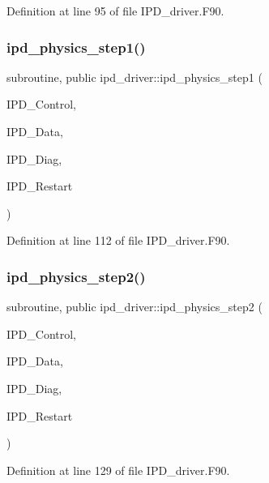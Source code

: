 Definition at line 95 of file I\+P\+D\+\_\+driver.\+F90.

\mbox{\label{namespaceipd__driver_abafd0a9f2cf822a3be45b837afe561fb}} 
\subsubsection{ipd\+\_\+physics\+\_\+step1()}
{\footnotesize\ttfamily subroutine, public ipd\+\_\+driver\+::ipd\+\_\+physics\+\_\+step1 (\begin{DoxyParamCaption}\item[{type(ipd\+\_\+control\+\_\+type), intent(inout)}]{I\+P\+D\+\_\+\+Control,  }\item[{type(ipd\+\_\+data\+\_\+type), intent(inout)}]{I\+P\+D\+\_\+\+Data,  }\item[{type(ipd\+\_\+diag\+\_\+type), dimension(\+:), intent(inout)}]{I\+P\+D\+\_\+\+Diag,  }\item[{type(ipd\+\_\+restart\+\_\+type), intent(inout)}]{I\+P\+D\+\_\+\+Restart }\end{DoxyParamCaption})}



Definition at line 112 of file I\+P\+D\+\_\+driver.\+F90.

\mbox{\label{namespaceipd__driver_a613c24c131f22ad6cc51bd3a33f9baee}} 
\subsubsection{ipd\+\_\+physics\+\_\+step2()}
{\footnotesize\ttfamily subroutine, public ipd\+\_\+driver\+::ipd\+\_\+physics\+\_\+step2 (\begin{DoxyParamCaption}\item[{type(ipd\+\_\+control\+\_\+type), intent(inout)}]{I\+P\+D\+\_\+\+Control,  }\item[{type(ipd\+\_\+data\+\_\+type), intent(inout)}]{I\+P\+D\+\_\+\+Data,  }\item[{type(ipd\+\_\+diag\+\_\+type), dimension(\+:), intent(inout)}]{I\+P\+D\+\_\+\+Diag,  }\item[{type(ipd\+\_\+restart\+\_\+type), intent(inout)}]{I\+P\+D\+\_\+\+Restart }\end{DoxyParamCaption})}



Definition at line 129 of file I\+P\+D\+\_\+driver.\+F90.

